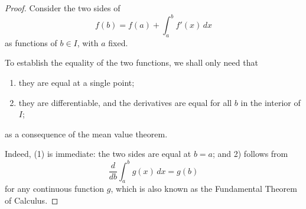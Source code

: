 

\begin{proof}

Consider the two sides of 
$$
f(b) = f(a) + \int_a^b f'(x)\,dx 
$$
as functions of $b\in I$, with $a$ fixed.

To establish the equality of the two functions, we shall only 
need that
\begin{enumerate}
\item they are equal at a single point;
\item they are differentiable, and the derivatives are equal 
for all $b$ in the interior of $I$;
\end{enumerate}
as a consequence of the mean value theorem.

Indeed, (1) is immediate: the two sides are equal at $b=a$; 
and 2) follows from 
$$
\frac{d}{db}\int_a^b g(x)\,dx = g(b)
$$
for any continuous function $g$, which is also known as 
the Fundamental Theorem of Calculus.

\end{proof}

